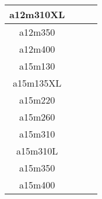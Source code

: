 \documentclass{article}
\begin{document}
\begin{table}[h!]
\begin{tabular}{|| c | c | c |c ||}
 \hline
 a12m310XL
 &  & & &     \\
 \hline
 a12m350
  &  & & &     \\
 \hline
 a12m400
  &  & & &     \\
 \hline
 a15m130
  &  & & &     \\
 \hline
 a15m135XL
  &  & & &     \\
 \hline
 a15m220
  &  & & &     \\
 \hline
 a15m260
  &  & & &     \\
 \hline
 a15m310
  &  & & &     \\
 \hline
 a15m310L
  &  & & &     \\
 \hline
 a15m350
  &  & & &     \\
 \hline
 a15m400
  &  & & &     \\
 \hline
 \end{tabular}
\end{table}




\clearpage
\end{document}
